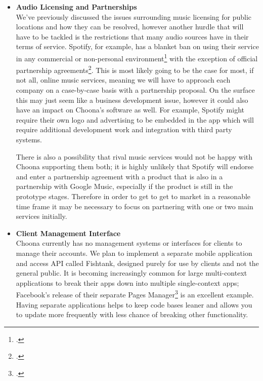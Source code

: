 \begin{itemize}
  \item \textbf{Audio Licensing and Partnerships}\\
    We've previously discussed the issues surrounding music licensing for public locations and how they can be resolved, however another hurdle that will have to be tackled is the restrictions that many audio sources have in their terms of service. Spotify, for example, has a blanket ban on using their service in any commercial or non-personal environment\footcite{spotifypublic} with the exception of official partnership agreements\footcite{spotifypartners}. This is most likely going to be the case for most, if not all, online music services, meaning we will have to approach each company on a case-by-case basis with a partnership proposal. On the surface this may just seem like a business development issue, however it could also have an impact on Choona's software as well. For example, Spotify might require their own logo and advertising to be embedded in the app which will require additional development work and integration with third party systems.

    There is also a possibility that rival music services would not be happy with Choona supporting them both; it is highly unlikely that Spotify will endorse and enter a partnership agreement with a product that is also in a partnership with Google Music, especially if the product is still in the prototype stages. Therefore in order to get to get to market in a reasonable time frame it may be necessary to focus on partnering with one or two main services initially.

  \item \textbf{Client Management Interface}\\
    Choona currently has no management systems or interfaces for clients to manage their accounts. We plan to implement a separate mobile application and access API called Fishtank, designed purely for use by clients and not the general public. It is becoming increasingly common for large multi-context applications to break their apps down into multiple single-context apps; Facebook's release of their separate Pages Manager\footcite{facebookpages} is an excellent example. Having separate applications helps to keep code bases leaner and allows you to update more frequently with less chance of breaking other functionality.


\end{itemize}
